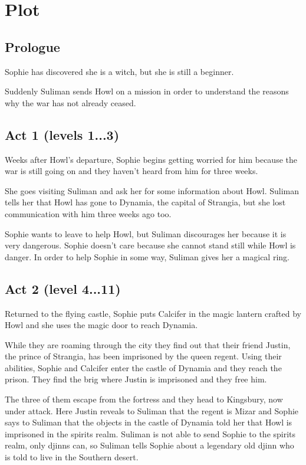 \section{Plot}

\subsection*{Prologue}
Sophie has discovered she is a witch, but she is still a beginner.

Suddenly Suliman sends Howl on a mission in order to understand the reasons why the war has not already ceased.

\subsection*{Act 1 (levels 1...3)}
Weeks after Howl's departure, Sophie begins getting worried for him because the war is still going on and they haven't heard from him for three weeks.

She goes visiting Suliman and ask her for some information about Howl. Suliman tells her that Howl has gone to Dynamia, the capital of Strangia, but she lost communication with him three weeks ago too.

Sophie wants to leave to help Howl, but Suliman discourages her because it is very dangerous. Sophie doesn't care because she cannot stand still while Howl is danger. In order to help Sophie in some way, Suliman gives her a magical ring.

\subsection*{Act 2 (level 4...11)}
Returned to the flying castle, Sophie puts Calcifer in the magic lantern crafted by Howl and she uses the magic door to reach Dynamia.

While they are roaming through the city they find out that their friend Justin, the prince of Strangia, has been imprisoned by the queen regent. Using their abilities, Sophie and Calcifer enter the castle of Dynamia and they reach the prison. They find the brig where Justin is imprisoned and they free him.

The three of them escape from the fortress and they head to Kingsbury, now under attack. Here Justin reveals to Suliman that the regent is Mizar and Sophie says to Suliman that the objects in the castle of Dynamia told her that Howl is imprisoned in the spirits realm. Suliman is not able to send Sophie to the spirits realm, only djinns can, so Suliman tells Sophie about a legendary old djinn who is told to live in the Southern desert.

